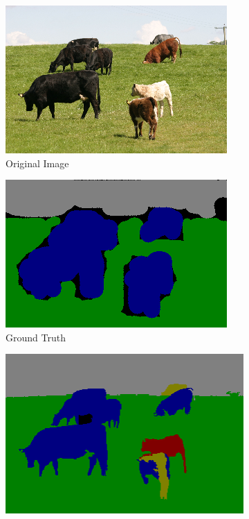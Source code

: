 \documentclass{article} %
\begin{document}
\begin{figure}[htb]
\centering
	\begin{subfigure}[t]{0.19\textwidth}
		\centering
		\includegraphics[width = \textwidth]{./img/1_11_s.png}
		\parbox{.95\textwidth}{\caption{Original Image \label{fig:orig_good}}}
			\end{subfigure}
	\begin{subfigure}[t]{0.19\textwidth}
		\centering
		\includegraphics[width = \textwidth]{./img/1_11_s_GT.png}
		\parbox{0.95\textwidth}{\caption{Ground Truth \label{fig:GT_good}}}
	\end{subfigure}
	\begin{subfigure}[t]{0.19\textwidth}
		\centering
		\includegraphics[width = \textwidth]{./img/1_11_s_prior.png}

\end{subfigure}
\end{figure}
\end{document}
